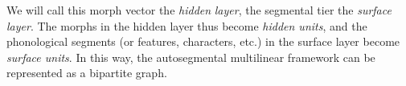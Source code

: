 
We will call this morph vector the \emph{hidden} \emph{layer}, 
the segmental tier the \emph{surface} \emph{layer}. The morphs 
in the hidden layer thus become \emph{hidden units}, and the phonological segments (or features, characters, etc.)
in the surface layer become \emph{surface units}.
In this way, the autosegmental multilinear framework can be 
represented as a bipartite graph.




